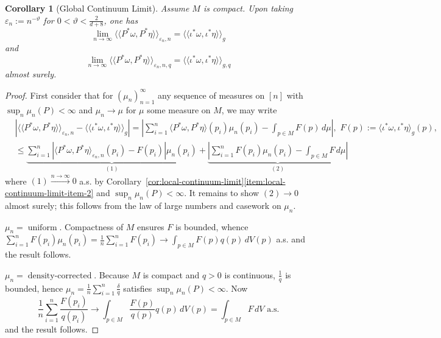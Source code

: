 \documentclass{article}
\newtheorem{corollary}[theorem]{Corollary}
\theoremstyle{remark}
\theoremstyle{plain}
\begin{document}

\begin{corollary}[Global Continuum Limit]

\label{cor:global-continuum-limit}
Assume \( M \) is \emph{compact}. Upon taking $\varepsilon_{n}:= n^{-\vartheta}$ for $0<\vartheta< \frac{2}{d+8}$, one has $$\lim_{n \to \infty} \langle \! \langle P^{*}\omega, P^{*} \eta \rangle \! \rangle_{\varepsilon_{n}, n} = \langle \! \langle \iota^{*} \omega, \iota^{*} \eta \rangle \! \rangle_{g} $$
and $$\lim_{n \to \infty} \langle \! \langle P^{*}\omega, P^{*}\eta \rangle  \! \rangle _{\varepsilon_{n}, n, q}=\langle \! \langle \iota^{*}\omega, \iota^{*}\eta \rangle \! \rangle_{g, q} $$
    almost surely.
\end{corollary}



\begin{proof}

    First consider that for $(\mu_{n})_{n=1}^{\infty}$ any sequence of measures on $[n]$ with $\sup_{n} \mu_{n}(P)<\infty$ and $\mu_{n} \to \mu$ for $\mu$ some measure on $M$, we may write \begin{align}
& \left | \langle \!  \langle P^{*}\omega, P^{*}\eta \rangle \! \rangle_{\varepsilon_{n}, n}   - \langle \! \langle \iota^{*}\omega, \iota^{*}\eta \rangle \! \rangle_{g}  \right|  = \left  | \sum_{i=1}^{n} \langle P^{*} \omega, P^{*}\eta \rangle(p_{i})\mu_{n}(p_{i}) - \int _{p \in M} F(p) \, d\mu       \right|, \, \, F(p):=\langle \iota^{*} \omega, \iota^{*} \eta \rangle_{g}(p), \\
& \leq \underbrace{ \sum_{i=1}^{n} |  \langle P^{*}\omega, P^{*}\eta \rangle_{\varepsilon_{n}, n} (p_{i} ) -   F(p_{i})  | \mu_{n}(p_{i})  }_{ \mathrm{(1)} }+ \underbrace{ | \sum_{i=1}^{n} F(p_{i}) \mu_{n}(p_{i} )  - \int _{p \in M} F \,d \mu  | }_{ \mathrm{(2)} }
\end{align}
where $(\mathrm{1}) \xrightarrow{n \to \infty} 0$ a.s. by Corollary~\ref{cor:local-continuum-limit}\eqref{item:local-continuum-limit-item-2} and $\sup_{n} \mu_{n}(P)<\infty$. It remains to show $\mathrm{(2)} \to 0$ almost surely; this follows from the law of large numbers and casework on $\mu_{n}$. 

\textit{$\mu_{n}=\operatorname{uniform}$}. Compactness of $M$ ensures $F$ is bounded, whence $\sum_{i=1}^{n} F(p_{i}) \mu_{n}(p_{i})=\frac{1}{n}\sum_{i=1}^{n} F(p_{i}) \to \int_{p \in M}F(p)q(p)\, dV(p)$ a.s. and the result follows.

\textit{$\mu_{n}=\operatorname{density-corrected}.$} Because $M$ is compact and $q>0$ is continuous, $\frac{1}{q}$ is bounded, hence $\mu_{n}=\frac{1}{n} \sum_{i=1}^{n} \frac{\delta}{q}$ satisfies $\sup_{n}\mu_{n}(P)<\infty$. Now $$\frac{1}{n} \sum_{i=1}^{n} \frac{F(p_{i})}{q(p_{i})} \to \int_{p \in M} \frac{F(p)}{q(p)}q(p)\, dV(p)=\int_{p \in M} F \, dV \text{ a.s.}$$
and the result follows.

\end{proof}
\end{document}
